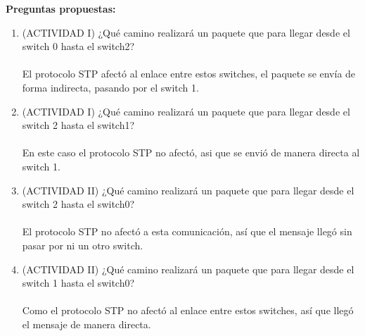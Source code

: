 \documentclass{udpreport}
\begin{document}
	
		{\large \bf{Preguntas propuestas: }}\\
	\begin{enumerate}
	    \item (ACTIVIDAD I) ¿Qué camino realizará un paquete que para llegar desde el switch 0 hasta el
                        switch2?\\\\
                    El protocolo STP afectó al enlace entre estos switches, el paquete se envía de forma indirecta, pasando por el switch 1.\\
        
        \item (ACTIVIDAD I) ¿Qué camino realizará un paquete que para llegar desde el switch 2 hasta el
                         switch1?\\\\
                         En este caso el protocolo STP no afectó, asi que se envió de manera directa al switch 1.\\
                                            
        \item (ACTIVIDAD II) ¿Qué camino realizará un paquete que para llegar desde el switch 2 hasta el
                            switch0? \\\\  
                        El protocolo STP no afectó a esta comunicación, así que el mensaje llegó sin pasar por ni un otro
                        switch.\\
                                          
        \item(ACTIVIDAD II) ¿Qué camino realizará un paquete que para llegar desde el switch 1 hasta el
                        switch0?\\\\
            Como el protocolo STP no afectó al enlace entre estos switches, así que llegó el mensaje de manera directa.\
        \newpage

	\end{enumerate}
\end{document}
